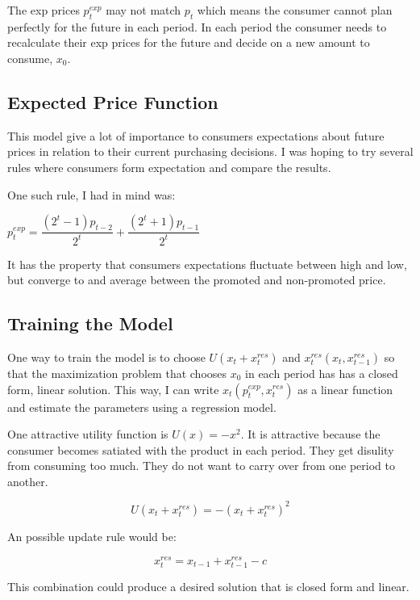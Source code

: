 \documentclass{article}
\begin{document}
The exp prices $p^{exp}_t$ may not match $p_t$ which means the consumer cannot plan perfectly for the future in each period. In each period the consumer needs to recalculate their exp prices for the future and decide on a new amount to consume, $x_0$.

\subsection{Expected Price Function}

This model give a lot of importance to consumers expectations about future prices in relation to their current purchasing decisions. I was hoping to try several rules where consumers form expectation and compare the results.

One such rule, I had in mind was:

$p^{exp}_t = \dfrac {(2^t-1)p_{t-2}} {2^t} + \dfrac {(2^t+1)p_{t-1}} {2^t}$ 

It has the property that consumers expectations fluctuate between high and low, but converge to and average between the promoted and non-promoted price.


\subsection{Training the Model}

One way to train the model is to choose $U(x_t + x^{res}_t)$ and $x^{res}_t(x_t,x^{res}_{t-1})$ so that the maximization problem that chooses $x_0$ in each period has has a closed form, linear solution. This way, I can write $x_t(p_t^{exp},x^{res}_t)$ as a linear function and estimate the parameters using a regression model.

One attractive utility function is $U(x) = -x^2$. It is attractive because the consumer becomes satiated with the product in each period. They get disulity from consuming too much. They do not want to carry over from one period to another.

$$U(x_t + x^{res}_t) = -(x_t + x^{res}_t)^2$$ 

An possible update rule would be:

$$x^{res}_t = x_{t-1} + x^{res}_{t-1} - c$$

This combination could produce a desired solution that is closed form and linear.

{}

\end{document}
